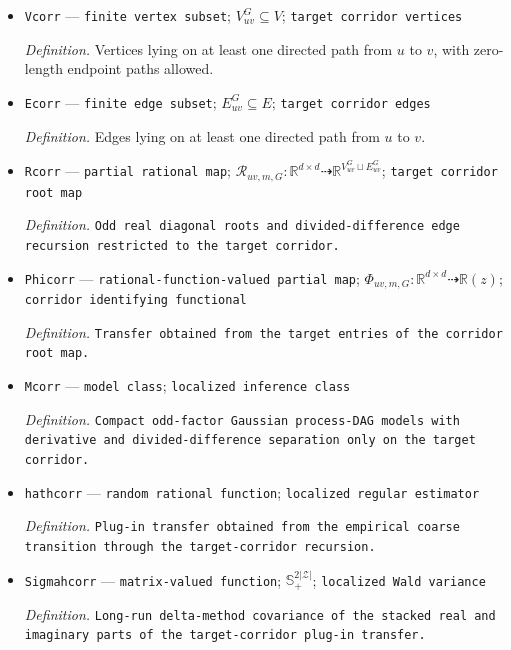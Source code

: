 \documentclass{article}
\begin{document}
\begin{itemize}
  \item \texttt{Vcorr} --- \texttt{finite vertex subset}; \(V_{uv}^{G}\subseteq V\); \texttt{target corridor vertices}
  \par\smallskip\noindent\emph{Definition.} Vertices lying on at least one directed path from \(u\) to \(v\), with zero-length endpoint paths allowed.
  \item \texttt{Ecorr} --- \texttt{finite edge subset}; \(E_{uv}^{G}\subseteq E\); \texttt{target corridor edges}
  \par\smallskip\noindent\emph{Definition.} Edges lying on at least one directed path from \(u\) to \(v\).
  \item \texttt{Rcorr} --- \texttt{partial rational map}; \(\mathscr R_{uv,m,G}:\mathbb R^{d\times d}\dashrightarrow\mathbb R^{V_{uv}^{G}\sqcup E_{uv}^{G}}\); \texttt{target corridor root map}
  \par\smallskip\noindent\emph{Definition.} \texttt{Odd real diagonal roots and divided-\allowbreak{}difference edge recursion restricted to the target corridor.}
  \item \texttt{Phicorr} --- \texttt{rational-\allowbreak{}function-\allowbreak{}valued partial map}; \(\Phi_{uv,m,G}:\mathbb R^{d\times d}\dashrightarrow\mathbb R(z)\); \texttt{corridor identifying functional}
  \par\smallskip\noindent\emph{Definition.} \texttt{Transfer obtained from the target entries of the corridor root map.}
  \item \texttt{Mcorr} --- \texttt{model class}; \texttt{localized inference class}
  \par\smallskip\noindent\emph{Definition.} \texttt{Compact odd-\allowbreak{}factor Gaussian process-\allowbreak{}DAG models with derivative and divided-\allowbreak{}difference separation only on the target corridor.}
  \item \texttt{hathcorr} --- \texttt{random rational function}; \texttt{localized regular estimator}
  \par\smallskip\noindent\emph{Definition.} \texttt{Plug-\allowbreak{}in transfer obtained from the empirical coarse transition through the target-\allowbreak{}corridor recursion.}
  \item \texttt{Sigmahcorr} --- \texttt{matrix-\allowbreak{}valued function}; \(\mathbb S_+^{2|\mathcal Z|}\); \texttt{localized Wald variance}
  \par\smallskip\noindent\emph{Definition.} \texttt{Long-\allowbreak{}run delta-\allowbreak{}method covariance of the stacked real and imaginary parts of the target-\allowbreak{}corridor plug-\allowbreak{}in transfer.}

\end{itemize}
\end{document}
